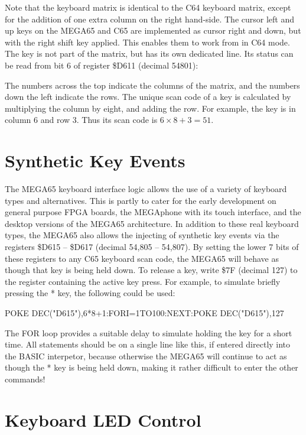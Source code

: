 Note that the keyboard matrix is identical to the C64 keyboard matrix, except for the addition of one extra column
on the right hand-side.  The cursor left and up keys on the MEGA65 and C65 are implemented as cursor right and down, but
with the right shift key applied.  This enables them to work from in C64 mode.  The  key is not
part of the matrix, but has its own dedicated line.  Its status can be read from bit 6 of register \$D611 (decimal 54801):

The numbers across the top indicate the columns of the matrix, and the numbers down the left indicate the rows.
The unique scan code of a key is calculated by multiplying the column by eight, and adding the row.  For example,
the  key is in column 6 and row 3. Thus its scan code is $6 \times 8 + 3 = 51$.

\section{Synthetic Key Events}

The MEGA65 keyboard interface logic allows the use of a variety of keyboard types and alternatives. This is partly
to cater for the early development on general purpose FPGA boards, the MEGAphone with its touch interface, and the
desktop versions of the MEGA65 architecture.  In addition to these real keyboard types, the MEGA65 also allows the
injecting of synthetic key events via the registers \$D615 -- \$D617 (decimal 54,805 -- 54,807).  By setting the
lower 7 bits of these registers to any C65 keyboard scan code, the MEGA65 will behave as though that key is being
held down.  To release a key, write \$7F (decimal 127) to the register containing the active key press. For example,
to simulate briefly pressing the * key, the following could be used:

\begin{screentext}
  POKE DEC("D615"),6*8+1:FORI=1TO100:NEXT:POKE DEC("D615"),127
\end{screentext}

The FOR loop provides a suitable delay to simulate holding the key for a short time.  All statements should be on a single line
like this, if entered directly into the BASIC interpetor, because otherwise the MEGA65 will continue to act as though the * key
is being held down, making it rather difficult to enter the other commands!

\section{Keyboard LED Control}

